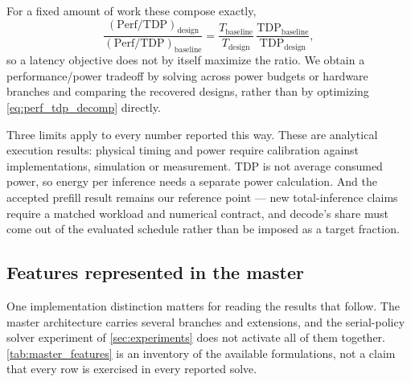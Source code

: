 For a fixed amount of work these compose exactly,
\begin{equation}
\frac{(\mathrm{Perf}/\mathrm{TDP})_{\mathrm{design}}}
     {(\mathrm{Perf}/\mathrm{TDP})_{\mathrm{baseline}}}
=
\frac{T_{\mathrm{baseline}}}{T_{\mathrm{design}}}\,
\frac{\mathrm{TDP}_{\mathrm{baseline}}}{\mathrm{TDP}_{\mathrm{design}}},
\label{eq:perf_tdp_decomp}
\end{equation}
so a latency objective does not by itself maximize the ratio. We obtain a
performance/power tradeoff by solving across power budgets or hardware
branches and comparing the recovered designs, rather than by optimizing
\cref{eq:perf_tdp_decomp} directly.

Three limits apply to every number reported this way. These are analytical
execution results: physical timing and power require calibration against
implementations, simulation or measurement. TDP is not average consumed power,
so energy per inference needs a separate power calculation. And the accepted
prefill result remains our reference point --- new total-inference claims
require a matched workload and numerical contract, and decode's share must come
out of the evaluated schedule rather than be imposed as a target fraction.

\subsection{Features represented in the master}
\label{sec:master_features}

One implementation distinction matters for reading the results that follow. The
master architecture carries several branches and extensions, and the serial-policy
solver experiment of \cref{sec:experiments} does not activate all of them
together. \cref{tab:master_features} is an inventory of the available
formulations, not a claim that every row is exercised in every reported solve.

